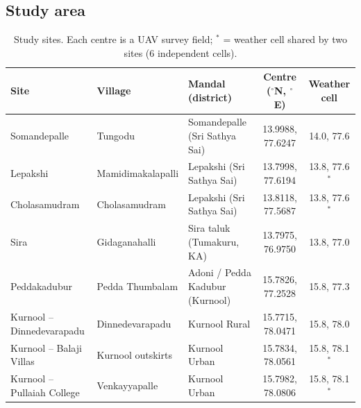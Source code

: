 \documentclass[11pt,a4paper,oneside]{article}
\begin{document}
\subsection{Study area}
\begin{table}[H]
\centering
\caption{Study sites. Each centre is a UAV survey field; $^*$ = weather cell shared by two sites (6 independent cells).}
\label{tab:sites}
\footnotesize
\setlength{\tabcolsep}{4pt}
\begin{tabular}{@{}lllcc@{}}
\toprule
\textbf{Site} & \textbf{Village} & \textbf{Mandal (district)} & \textbf{Centre ($^\circ$N, $^\circ$E)} & \textbf{Weather cell} \\
\midrule
Somandepalle & Tungodu & Somandepalle (Sri Sathya Sai) & 13.9988, 77.6247 & 14.0, 77.6 \\
Lepakshi & Mamidimakalapalli & Lepakshi (Sri Sathya Sai) & 13.7998, 77.6194 & 13.8, 77.6$^*$ \\
Cholasamudram & Cholasamudram & Lepakshi (Sri Sathya Sai) & 13.8118, 77.5687 & 13.8, 77.6$^*$ \\
Sira & Gidaganahalli & Sira taluk (Tumakuru, KA) & 13.7975, 76.9750 & 13.8, 77.0 \\
Peddakadubur & Pedda Thumbalam & Adoni / Pedda Kadubur (Kurnool) & 15.7826, 77.2528 & 15.8, 77.3 \\
Kurnool -- Dinnedevarapadu & Dinnedevarapadu & Kurnool Rural & 15.7715, 78.0471 & 15.8, 78.0 \\
Kurnool -- Balaji Villas & Kurnool outskirts & Kurnool Urban & 15.7834, 78.0561 & 15.8, 78.1$^*$ \\
Kurnool -- Pullaiah College & Venkayyapalle & Kurnool Urban & 15.7982, 78.0806 & 15.8, 78.1$^*$ \\
\bottomrule
\end{tabular}
\end{table}
\end{document}
